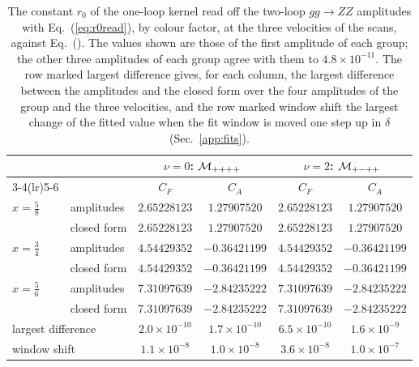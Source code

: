 \begin{table}[!htb]
\centering
\footnotesize
\setlength{\tabcolsep}{5pt}
\begin{tabular}{llcccc}
\toprule
& & \multicolumn{2}{c}{$\nu=0$: $\mathcal M_{{+}{+}{+}{+}}$} & \multicolumn{2}{c}{$\nu=2$: $\mathcal M_{{+}{-}{+}{+}}$}\\
\cmidrule(lr){3-4}\cmidrule(lr){5-6}
& & $C_F$ & $C_A$ & $C_F$ & $C_A$\\
\midrule
$x=\frac58$ & amplitudes & $2.65228123$ & $1.27907520$ & $2.65228123$ & $1.27907520$\\
 & closed form & $2.65228123$ & $1.27907520$ & $2.65228123$ & $1.27907520$\\
$x=\frac34$ & amplitudes & $4.54429352$ & $-0.36421199$ & $4.54429352$ & $-0.36421199$\\
 & closed form & $4.54429352$ & $-0.36421199$ & $4.54429352$ & $-0.36421199$\\
$x=\frac56$ & amplitudes & $7.31097639$ & $-2.84235222$ & $7.31097639$ & $-2.84235222$\\
 & closed form & $7.31097639$ & $-2.84235222$ & $7.31097639$ & $-2.84235222$\\
\midrule
\multicolumn{2}{l}{largest difference} & $2.0\times10^{-10}$ & $1.7\times10^{-10}$ & $6.5\times10^{-10}$ & $1.6\times10^{-9}$\\
\multicolumn{2}{l}{window shift} & $1.1\times10^{-8}$ & $1.0\times10^{-8}$ & $3.6\times10^{-8}$ & $1.0\times10^{-7}$\\
\bottomrule
\end{tabular}
\caption{The constant $r_0$ of the one-loop kernel read off the two-loop $gg\to ZZ$ amplitudes with Eq.~(\ref{eq:r0read}), by colour factor, at the three velocities of the scans, against Eq.~(). The values shown are those of the first amplitude of each group; the other three amplitudes of each group agree with them to $4.8\times10^{-11}$. The row marked largest difference gives, for each column, the largest difference between the amplitudes and the closed form over the four amplitudes of the group and the three velocities, and the row marked window shift the largest change of the fitted value when the fit window is moved one step up in $\delta$ (Sec.~\ref{app:fits}).}
\label{tab:r0zz}
\end{table}
